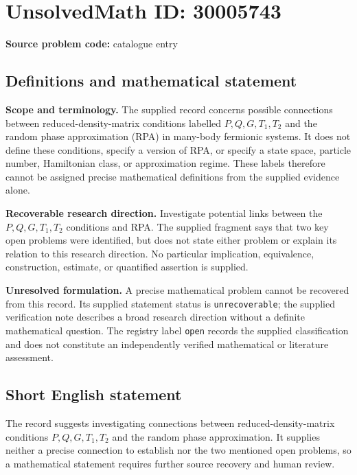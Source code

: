 \documentclass[11pt]{article}
\begin{document}
\section*{UnsolvedMath ID: 30005743}
\textbf{Source problem code:} catalogue entry
\subsection{Definitions and mathematical statement}
\textbf{Scope and terminology.} The supplied record concerns possible connections between reduced-density-matrix conditions labelled \(P,Q,G,T_1,T_2\) and the random phase approximation (RPA) in many-body fermionic systems. It does not define these conditions, specify a version of RPA, or specify a state space, particle number, Hamiltonian class, or approximation regime. These labels therefore cannot be assigned precise mathematical definitions from the supplied evidence alone.

\textbf{Recoverable research direction.} Investigate potential links between the \(P,Q,G,T_1,T_2\) conditions and RPA. The supplied fragment says that two key open problems were identified, but does not state either problem or explain its relation to this research direction. No particular implication, equivalence, construction, estimate, or quantified assertion is supplied.

\textbf{Unresolved formulation.} A precise mathematical problem cannot be recovered from this record. Its supplied statement status is \texttt{unrecoverable}; the supplied verification note describes a broad research direction without a definite mathematical question. The registry label \texttt{open} records the supplied classification and does not constitute an independently verified mathematical or literature assessment.
\subsection{Short English statement}
The record suggests investigating connections between reduced-density-matrix conditions \(P,Q,G,T_1,T_2\) and the random phase approximation. It supplies neither a precise connection to establish nor the two mentioned open problems, so a mathematical statement requires further source recovery and human review.
\end{document}
